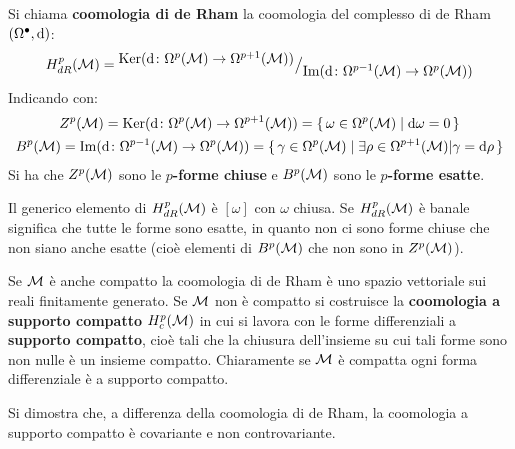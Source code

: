 \begin{definition}
  Si chiama \textbf{coomologia di de Rham} la
  coomologia del complesso di de Rham $ (\Omega^\bullet, \operatorname{d}\!{}) $:
  \[
    H^p_{dR}(\mathcal{M}) = {^{\textstyle \mathrm{Ker}(  \operatorname{d}\!{} \colon \Omega^p(\mathcal{M}) \to \Omega^{p+1}(\mathcal{M}))}\big/_{\textstyle \mathrm{Im}( \operatorname{d}\!{} \colon \Omega^{p-1}(\mathcal{M}) \to \Omega^p(\mathcal{M}) )}}
  \]
  Indicando con:
  \begin{gather*}
    Z^p(\mathcal{M}) = \mathrm{Ker}(  \operatorname{d}\!{} \colon \Omega^p(\mathcal{M}) \to \Omega^{p+1}(\mathcal{M})) = \set{\omega \in \Omega^p(\mathcal{M}) | \ensuremath{\operatorname{d}\!{\omega}} = 0} \\
    B^p(\mathcal{M}) = \mathrm{Im}( \operatorname{d}\!{} \colon \Omega^{p-1}(\mathcal{M}) \to \Omega^p(\mathcal{M}) ) = \set{\gamma \in \Omega^p(\mathcal{M}) | \exists \rho \in \Omega^{p+1}(\mathcal{M}) | \gamma = \ensuremath{\operatorname{d}\!{\rho}}}
  \end{gather*}
  Si ha che $ Z^p(\mathcal{M}) $ sono le  \textbf{$ p $-forme chiuse} e $ B^p(\mathcal{M}) $ sono
  le \textbf{ $ p $-forme esatte}.
\end{definition}
Il generico elemento di $ H^p_{dR}(\mathcal{M}) $ è $ [\omega] $ con $ \omega $ chiusa. Se
$ H^p_{dR}(\mathcal{M}) $ è banale significa che tutte le forme sono esatte, in quanto
non ci sono forme chiuse che non siano anche esatte (cioè elementi di
$ B^p(\mathcal{M}) $ che non sono in $ Z^p(\mathcal{M}) $).
\begin{osservation}
  Se $ \mathcal{M} $ è anche compatto la coomologia di de Rham è uno spazio vettoriale
  sui reali finitamente generato. Se $ \mathcal{M} $ non è compatto si costruisce la
  \textbf{coomologia a supporto compatto}
  $ H^p_c(\mathcal{M}) $ in cui si lavora con le forme differenziali a \textbf{supporto
    compatto}, cioè tali che la chiusura dell'insieme
  su cui tali forme sono non nulle è un insieme compatto. Chiaramente se $ \mathcal{M} $ è
  compatta ogni forma differenziale è a supporto compatto.
\end{osservation}
\begin{lemma}
  Si dimostra che, a differenza della coomologia di de Rham, la coomologia a supporto
  compatto è covariante e non controvariante.
\end{lemma}

